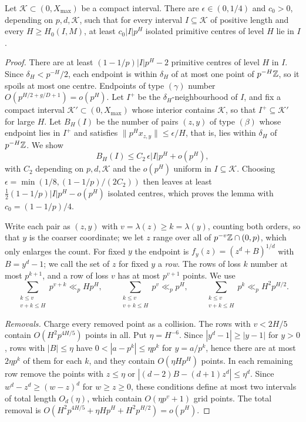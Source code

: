 \documentclass[11pt]{article}
\newcommand{\dist}[1]{\lVert #1\rVert}
\begin{document}
\begin{lemma}\label{lem:isolated}
Let $\mathcal K\subset(0,X_{\max})$ be a compact interval. There are $\epsilon\in(0,1/4)$ and $c_0>0$,
depending on $p,d,\mathcal K$, such that for every interval $I\subseteq\mathcal K$ of positive length and
every $H\ge H_0(I,M)$, at least $c_0|I|p^H$ isolated primitive centres of level $H$ lie in $I$.
\end{lemma}

\begin{proof}
There are at least $(1-1/p)|I|p^H-2$ primitive centres of level $H$ in $I$. Since $\delta_H<p^{-H}/2$,
each endpoint is within $\delta_H$ of at most one point of $p^{-H}\mathbb Z$, so it spoils at most one centre.
Endpoints of type $(\gamma)$ number $O(p^{H/2+g/D+1})=o(p^H)$. Let $I^+$ be the
$\delta_H$-neighbourhood of $I$, and fix a compact interval $\mathcal K'\subset(0,X_{\max})$ whose
interior contains $\mathcal K$, so that $I^+\subseteq\mathcal K'$ for large $H$. Let $B_H(I)$ be the number of pairs $(z,y)$ of type $(\beta)$
whose endpoint lies in $I^+$ and satisfies $\dist{p^Hx_{z,y}}\le\epsilon/H$, that is, lies within
$\delta_H$ of $p^{-H}\mathbb Z$. We show
\begin{equation}\label{eq:collision}
B_H(I)\le C_2\,\epsilon|I|p^H+o(p^H),
\end{equation}
with $C_2$ depending on $p,d,\mathcal K$ and the $o(p^H)$ uniform in $I\subseteq\mathcal K$. Choosing
$\epsilon=\min(1/8,(1-1/p)/(2C_2))$ then leaves at least $\frac12(1-1/p)|I|p^H-o(p^H)$ isolated centres,
which proves the lemma with $c_0=(1-1/p)/4$.

Write each pair as $(z,y)$ with $v=\lambda(z)\ge k=\lambda(y)$, counting both orders, so that $y$ is the
coarser coordinate; we let $z$ range over all of $p^{-v}\mathbb Z\cap(0,p)$, which only enlarges the count. For
fixed $y$ the endpoint is $f_y(z)=(z^d+B)^{1/d}$ with $B=y^d-1$; we call the set of $z$ for fixed $y$ a
\emph{row}. The rows of loss $k$ number at most $p^{k+1}$, and a row of loss $v$ has at most $p^{v+1}$
points. We use
\[
\sum_{\substack{k\le v\\v+k\le H}}p^{v+k}\ll_pHp^H,\qquad
\sum_{\substack{k\le v\\v+k\le H}}p^{v}\ll_pp^H,\qquad
\sum_{\substack{k\le v\\v+k\le H}}p^{k}\ll_pH^2p^{H/2}.
\]

\emph{Removals.} Charge every removed point as a collision. The rows with $v<2H/5$ contain
$O(H^2p^{4H/5})$ points in all. Put $\eta=H^{-6}$. Since $|y^d-1|\ge|y-1|$ for $y>0$, rows with
$|B|\le\eta$ have $0<|a-p^k|\le\eta p^k$ for $y=a/p^k$, hence there are at most $2\eta p^k$ of them for
each $k$, and they contain $O(\eta Hp^H)$ points. In each remaining row remove the points with
$z\le\eta$ or $|(d-2)B-(d+1)z^d|\le\eta^d$. Since $w^d-z^d\ge(w-z)^d$ for $w\ge z\ge0$, these conditions
define at most two intervals of total length $O_d(\eta)$, which contain $O(\eta p^v+1)$ grid points. The
total removal is $O(H^2p^{4H/5}+\eta Hp^H+H^2p^{H/2})=o(p^H)$.


\end{proof}
\end{document}

